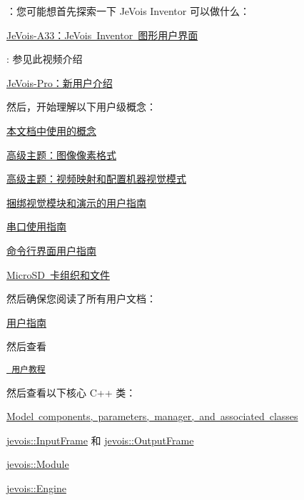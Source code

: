 
\begin{DoxyItemize}
\item ：您可能想首先探索一下 Je\+Vois Inventor 可以做什么：
\item \mbox{\hyperlink{JeVoisInventor}{Je\+Vois-\/\+A33：\+Je\+Vois Inventor 图形用户界面}}
\item \+: 参见此视频介绍
\begin{DoxyItemize}
\item \mbox{\hyperlink{JeVoisProIntro}{Je\+Vois-\/\+Pro：新用户介绍}}
\end{DoxyItemize}
\item 然后，开始理解以下用户级概念：
\begin{DoxyItemize}
\item \mbox{\hyperlink{Concepts}{本文档中使用的概念}}
\item \mbox{\hyperlink{PixelFormats}{高级主题：图像像素格式}}
\item \mbox{\hyperlink{VideoMapping}{高级主题：视频映射和配置机器视觉模式}}
\item \mbox{\hyperlink{UserDemos}{捆绑视觉模块和演示的用户指南}}
\item \mbox{\hyperlink{UserSerial}{串口使用指南}}
\item \mbox{\hyperlink{UserCli}{命令行界面用户指南}}
\item \mbox{\hyperlink{MicroSD}{Micro\+SD 卡组织和文件}}
\end{DoxyItemize}
\item 然后确保您阅读了所有用户文档：
\begin{DoxyItemize}
\item \mbox{\hyperlink{User}{用户指南}}
\end{DoxyItemize}
\item 然后查看
\begin{DoxyItemize}
\item \href{/tutorials}{\texttt{ 用户教程}}
\end{DoxyItemize}
\item 然后查看以下核心 C++ 类：
\begin{DoxyItemize}
\item \mbox{\hyperlink{group__component}{Model components, parameters, manager, and associated classes}}
\item \mbox{\hyperlink{classjevois_1_1InputFrame}{jevois\+::\+Input\+Frame}} 和 \mbox{\hyperlink{classjevois_1_1OutputFrame}{jevois\+::\+Output\+Frame}}
\item \mbox{\hyperlink{classjevois_1_1Module}{jevois\+::\+Module}}
\item \mbox{\hyperlink{classjevois_1_1Engine}{jevois\+::\+Engine}}

\end{DoxyItemize}
\end{DoxyItemize}
